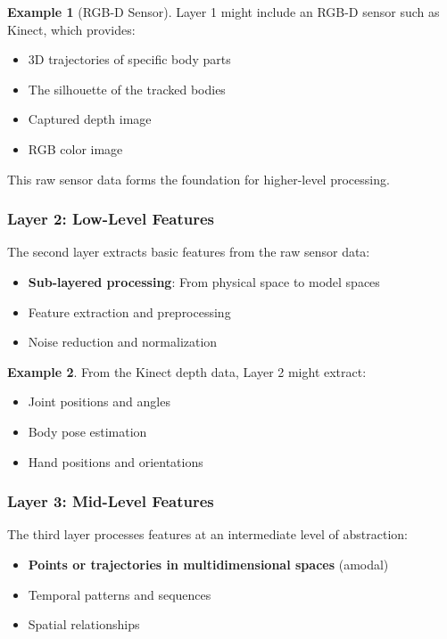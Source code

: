 \documentclass[11pt,a4paper]{article}
\theoremstyle{definition}
\newtheorem{example}{Example}[section]
\theoremstyle{plain}
\theoremstyle{remark}
\begin{document}
\begin{example}[RGB-D Sensor]
Layer 1 might include an RGB-D sensor such as Kinect, which provides:
\begin{itemize}
    \item 3D trajectories of specific body parts
    \item The silhouette of the tracked bodies
    \item Captured depth image
    \item RGB color image
\end{itemize}

This raw sensor data forms the foundation for higher-level processing.
\end{example}

\subsubsection{Layer 2: Low-Level Features}

The second layer extracts basic features from the raw sensor data:

\begin{itemize}
    \item \textbf{Sub-layered processing}: From physical space to model spaces
    \item Feature extraction and preprocessing
    \item Noise reduction and normalization
\end{itemize}

\begin{example}
From the Kinect depth data, Layer 2 might extract:
\begin{itemize}
    \item Joint positions and angles
    \item Body pose estimation
    \item Hand positions and orientations
\end{itemize}
\end{example}

\subsubsection{Layer 3: Mid-Level Features}

The third layer processes features at an intermediate level of abstraction:

\begin{itemize}
    \item \textbf{Points or trajectories in multidimensional spaces} (amodal)
    \item Temporal patterns and sequences
    \item Spatial relationships
\end{itemize}
\end{document}
